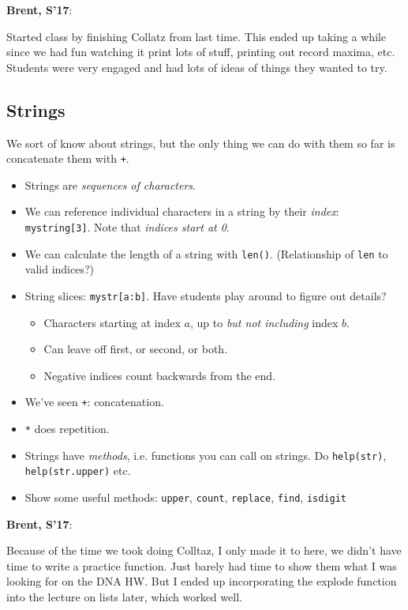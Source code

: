 \documentclass{article}
\newenvironment{reflect}[1]
{
  \noindent
  \begin{lrbox}{\reflectbox}
    \begin{minipage}[t]{\textwidth}
      \textbf{#1}:
}{
    \end{minipage}
  \end{lrbox}
  \fbox{\usebox{\reflectbox}}
}
\begin{document}
\begin{reflect}{Brent, S'17}
  Started class by finishing Collatz from last time.  This ended up
  taking a while since we had fun watching it print lots of stuff,
  printing out record maxima, etc.  Students were very engaged and had
  lots of ideas of things they wanted to try.
\end{reflect}

\subsection*{Strings}

We sort of know about strings, but the only thing we can do with them
so far is concatenate them with \verb|+|.

\begin{itemize}
\item Strings are \emph{sequences of characters}.

\item We can reference individual characters in a string by their
  \emph{index}: \verb|mystring[3]|.  Note that \emph{indices start at 0}.

\item We can calculate the length of a string with \verb|len()|.
  (Relationship of \verb|len| to valid indices?)

\item String slices: \verb|mystr[a:b]|.  Have students play around to
  figure out details?
  \begin{itemize}
  \item Characters starting at index $a$, up to \emph{but not
      including} index $b$.
  \item Can leave off first, or second, or both.
  \item Negative indices count backwards from the end.
  \end{itemize}

\item We've seen \verb|+|: concatenation.
\item \verb|*| does repetition.

\item Strings have \emph{methods}, i.e. functions you can call on
  strings.  Do \verb|help(str)|, \verb|help(str.upper)| etc.
\item Show some useful methods: \verb|upper|, \verb|count|,
  \verb|replace|, \verb|find|, \verb|isdigit|
\end{itemize}

\begin{reflect}{Brent, S'17}
  Because of the time we took doing Colltaz, I only made it to here,
  we didn't have time to write a practice function.  Just barely had
  time to show them what I was looking for on the DNA HW.  But I ended
  up incorporating the explode function into the lecture on lists
  later, which worked well.
\end{reflect}
\end{document}
